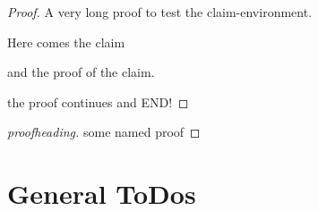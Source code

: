 \begin{proof}
  A very long proof to test the claim-environment.

  \blindtext

  \begin{claim}
    Here comes the claim
  \end{claim}

  \begin{claimproof}{}
    and the proof of the claim.
  \end{claimproof}
  
  the proof continues
  \blindtext
  and END!
\end{proof}

\blindtext

\begin{proof}[proofheading]
 some named proof 
\end{proof}



\clearpage

\section{General ToDos}
\label{sec:todos}





